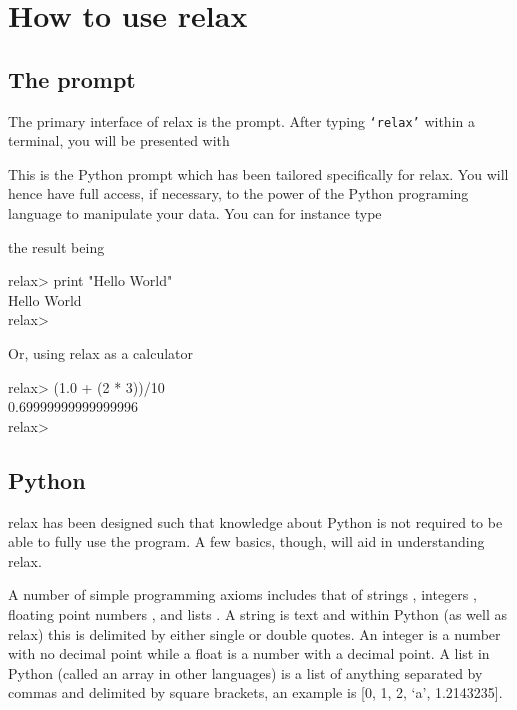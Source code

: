
\chapter{How to use relax}



\section{The prompt}

The primary interface of relax is the prompt.  After typing \texttt{`relax'} within a terminal, you will be presented with


This is the Python prompt which has been tailored specifically for relax.  You will hence have full access, if necessary, to the power of the Python  programing language to manipulate your data.  You can for instance type


the result being

\begin{exampleenv}
relax> print "Hello World" \\
Hello World \\
relax> \\
\end{exampleenv}

Or, using relax as a calculator

\begin{exampleenv}
relax> (1.0 + (2 * 3))/10 \\
0.69999999999999996 \\
relax> \\
\end{exampleenv}




\section{Python}

relax has been designed such that knowledge about Python is not required to be able to fully use the program.  A few basics, though, will aid in understanding relax.

A number of simple programming axioms includes that of strings , integers , floating point numbers , and lists .  A string is text and within Python (as well as relax) this is delimited by either single or double quotes.  An integer is a number with no decimal point while a float is a number with a decimal point.  A list in Python (called an array in other languages) is a list of anything separated by commas and delimited by square brackets, an example is [0, 1, 2, `a', 1.2143235].

